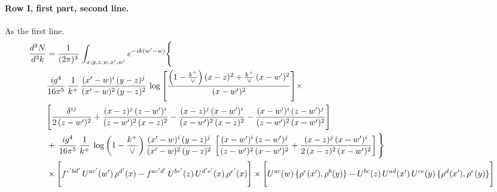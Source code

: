 \documentclass[10pt]{article}
\numberwithin{equation}{section}
\begin{document}
\paragraph{Row I, first part, second line.}
As the first line.
\begin{align}
\frac{d^{3}N}{d^{3}k} & =  \frac{1}{(2\pi)^{3}}\,\int_{x,y,z,w,x',w^{\prime}} e^{-ik(w^{\prime}-w)}\Bigg\{\notag \\
&  \frac{ig^{4}}{16\pi^{5}}\,\frac{1}{k^{+}}\, \frac{(x'-w)^{i}\,(y-z)^{j}}{(x'-w)^{2}\,(y-z)^{2}}\,\log{\left[\frac{\left(1-\frac{k^{+}}{\vee}\right)(x-z)^{2}+\frac{k^{+}}{\vee}\,(x-w')^{2}}{(x-w')^{2}}\right]}\times\notag \\ &  \Bigg[\frac{\delta^{ij}}{2\,(z-w')^{2}}+\frac{(x-z)^{j}\,(z-w')^{i}}{(z-w')^{2}\,(x-z)^{2}}-\frac{(x-z)^{j}\,(x-w')^{i}}{(x-w')^{2}\,(x-z)^{2}}-\frac{(x-w')^{i}\,(z-w')^{j}}{(z-w')^{2}\,(x-w')^{2}}\Bigg] \notag \\
& +\,\frac{ig^{4}}{16\pi^{5}}\,\frac{1}{k^{+}}\,\log{\left(1-\frac{k^{+}}{\vee}\right)}\,\frac{(x'-w)^{i}\,(y-z)^{j}}{(x'-w)^{2}\,(y-z)^{2}}\,\left[\frac{(x-w')^{i}\,(z-w')^{j}}{(z-w')^{2}\,(x-w')^{2}}+\frac{(x-z)^{j}\,(x-w')^{i}}{2\,(x-z)^{2}\, (x-w')^{2}}\right]\Bigg\} \notag \\ & \times\Bigg[f^{c'bd'}\,U^{ac'}(w')\,\rho^{d'}(x)-f^{ac'd'}\, U^{bc'}(z)\,U^{d'e'}(x)\,\rho^{e'}(x)\Bigg] \times \Bigg[U^{ac}(w)\,\{\rho^{c}(x'),\rho^{b}(y)\}-U^{bc}(z)\,U^{ad}(x')\,U^{ce}(y)\, \{\rho^{d}(x'),\rho^{e}(y)\}\Bigg] \label{eq:F:G2I1B}
\end{align}
\end{document}
